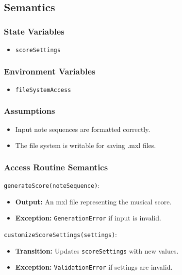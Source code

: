 \documentclass[12pt, titlepage]{article}
\begin{document}
\subsection{Semantics}  

\subsubsection{State Variables}  
\begin{itemize}  
    \item \texttt{scoreSettings}  
\end{itemize}  

\subsubsection{Environment Variables}  
\begin{itemize}  
    \item \texttt{fileSystemAccess}  
\end{itemize}  

\subsubsection{Assumptions}  
\begin{itemize}  
    \item Input note sequences are formatted correctly.  
    \item The file system is writable for saving .mxl files.  
\end{itemize}  

\subsubsection{Access Routine Semantics}  

\noindent \texttt{generateScore(noteSequence)}:
\begin{itemize}  
    \item \textbf{Output:} An mxl file representing the musical score.  
    \item \textbf{Exception:} \texttt{GenerationError} if input is invalid.  
\end{itemize}  

\noindent \texttt{customizeScoreSettings(settings)}:
\begin{itemize}  
    \item \textbf{Transition:} Updates \texttt{scoreSettings} with new values.  
    \item \textbf{Exception:} \texttt{ValidationError} if settings are invalid.  
\end{itemize}  
\end{document}
